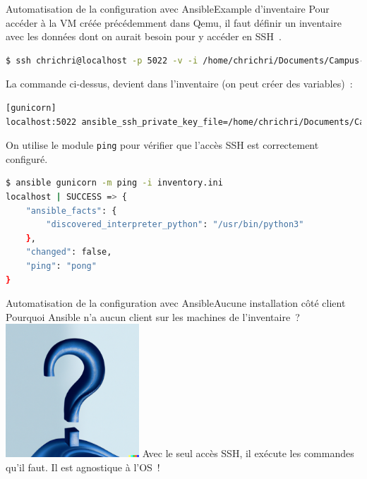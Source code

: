 \documentclass{beamer}
\begin{document}
    \begin{frame}[fragile]{Automatisation de la configuration avec Ansible}{Example d'inventaire}
        Pour accéder à la VM créée précédemment dans Qemu, il faut définir un inventaire avec les données dont on aurait besoin pour y accéder en SSH~.
        \begin{lstlisting}[language=bash,basicstyle=\ttfamily\tiny]
$ ssh chrichri@localhost -p 5022 -v -i /home/chrichri/Documents/Campus-St-Michel-IT/production-deployment/virt-ubuntu
        \end{lstlisting}
        La commande ci-dessus, devient dans l'inventaire (on peut créer des variables)~:
        \begin{lstlisting}[language=bash,basicstyle=\ttfamily\tiny]
[gunicorn]
localhost:5022 ansible_ssh_private_key_file=/home/chrichri/Documents/Campus-St-Michel-IT/production-deployment/virt-ubuntu ansible_ssh_user=chrichri
        \end{lstlisting}
        On utilise le module \lstinline{ping} pour vérifier que l'accès SSH est correctement configuré.
        \begin{lstlisting}[language=bash,basicstyle=\ttfamily\tiny]
$ ansible gunicorn -m ping -i inventory.ini
localhost | SUCCESS => {
    "ansible_facts": {
        "discovered_interpreter_python": "/usr/bin/python3"
    },
    "changed": false,
    "ping": "pong"
}
        \end{lstlisting}
    \end{frame}

    \begin{frame}{Automatisation de la configuration avec Ansible}{Aucune installation côté client}
        Pourquoi Ansible n'a aucun client sur les machines de l'inventaire~?
        \bigbreak
        \centering
        \includegraphics[width=5cm]{image/question-mark-on-a-blank-background}
        \bigbreak
        \pause
        \flushleft
        Avec le seul accès SSH, il exécute les commandes qu'il faut.
        Il est agnostique à l'OS~!
    \end{frame}
\end{document}
